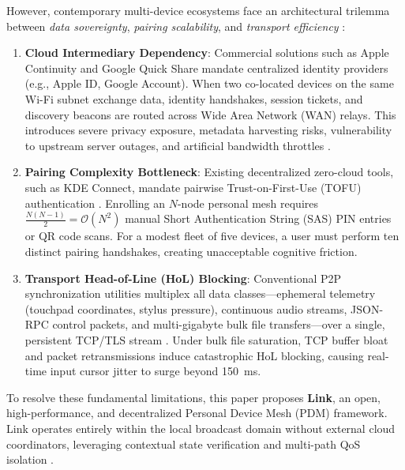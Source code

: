 \documentclass[conference]{IEEEtran}
\begin{document}
However, contemporary multi-device ecosystems face an architectural trilemma between \textit{data sovereignty}, \textit{pairing scalability}, and \textit{transport efficiency} \cite{kumar2025p2pmesh, wu2025recursive}:
\begin{enumerate}
    \item \textbf{Cloud Intermediary Dependency}: Commercial solutions such as Apple Continuity and Google Quick Share mandate centralized identity providers (e.g., Apple ID, Google Account). When two co-located devices on the same Wi-Fi subnet exchange data, identity handshakes, session tickets, and discovery beacons are routed across Wide Area Network (WAN) relays. This introduces severe privacy exposure, metadata harvesting risks, vulnerability to upstream server outages, and artificial bandwidth throttles \cite{heinrich2021airdrop, singh2024privacy}.
    \item \textbf{Pairing Complexity Bottleneck}: Existing decentralized zero-cloud tools, such as KDE Connect, mandate pairwise Trust-on-First-Use (TOFU) authentication \cite{alrawi2023iot, chen2024decentralized}. Enrolling an $N$-node personal mesh requires $\frac{N(N-1)}{2} = \mathcal{O}(N^2)$ manual Short Authentication String (SAS) PIN entries or QR code scans. For a modest fleet of five devices, a user must perform ten distinct pairing handshakes, creating unacceptable cognitive friction.
    \item \textbf{Transport Head-of-Line (HoL) Blocking}: Conventional P2P synchronization utilities multiplex all data classes---ephemeral telemetry (touchpad coordinates, stylus pressure), continuous audio streams, JSON-RPC control packets, and multi-gigabyte bulk file transfers---over a single, persistent TCP/TLS stream \cite{tan2024holblocking, wang2024quicpan, liu2024dynamicflow}. Under bulk file saturation, TCP buffer bloat and packet retransmissions induce catastrophic HoL blocking, causing real-time input cursor jitter to surge beyond 150~ms.
\end{enumerate}

To resolve these fundamental limitations, this paper proposes \textbf{Link}, an open, high-performance, and decentralized Personal Device Mesh (PDM) framework. Link operates entirely within the local broadcast domain without external cloud coordinators, leveraging contextual state verification \cite{ghosh2024contextual} and multi-path QoS isolation \cite{yang2025qos, mei2025omnirouter}. 
\end{document}
